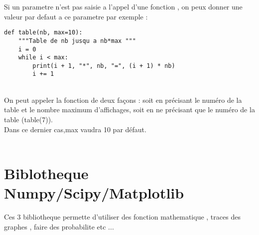 \documentclass[a4paper,12pt,openany]{book}
\begin{document}
Si un parametre n'est pas saisie a l'appel d'une fonction , on peux donner une valeur par defaut a ce parametre par exemple :\\

\begin{DDbox}{\linewidth}
\begin{lstlisting}
def table(nb, max=10):
    """Table de nb jusqu a nb*max """
    i = 0
    while i < max:
        print(i + 1, "*", nb, "=", (i + 1) * nb)
        i += 1
\end{lstlisting}
\end{DDbox}{\linewidth}
\\
On peut appeler la fonction de deux façons : soit en précisant le num\'ero de la table et le nombre maximum d'affichages, soit en ne précisant que le numéro de la table (table(7)).\\
Dans ce dernier cas,max vaudra 10 par défaut.\\
\\

\chapter{Biblotheque Numpy/Scipy/Matplotlib}

Ces 3 bibliotheque permette d'utiliser des fonction mathematique , traces des graphes , faire des probabilite etc $...$ \\
\end{document}
